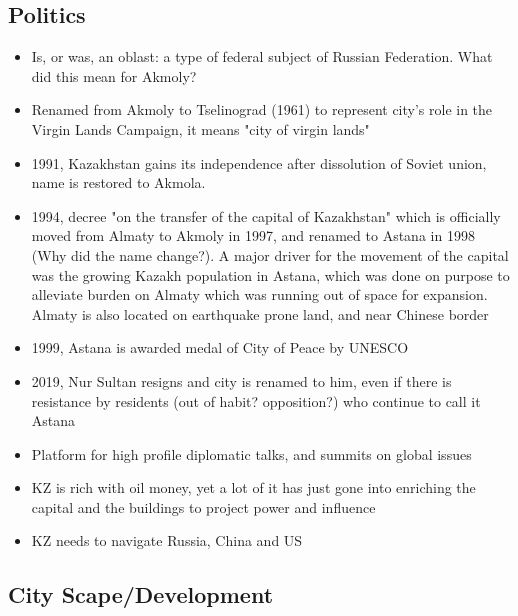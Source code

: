 \documentclass[12pt]{article}
\begin{document}
\subsection{Politics}

\begin{itemize}
  \item Is, or was, an oblast: a type of federal subject of Russian Federation. What did this mean for Akmoly? 
  \item Renamed from Akmoly to Tselinograd (1961) to represent city's role in the Virgin Lands Campaign, it means "city of virgin lands"
  \item 1991, Kazakhstan gains its independence after dissolution of Soviet union, name is restored to Akmola.
  \item 1994, decree "on the transfer of the capital of Kazakhstan" which is officially moved from Almaty to Akmoly in 1997, and renamed to Astana in 1998 (Why did the name change?). A major driver for the movement of the capital was the growing Kazakh population in Astana, which was done on purpose to alleviate burden on Almaty which was running out of space for expansion. Almaty is also located on earthquake prone land, and near Chinese border
  \item 1999, Astana is awarded medal of City of Peace by UNESCO
  \item 2019, Nur Sultan resigns and city is renamed to him, even if there is resistance by residents (out of habit? opposition?) who continue to call it Astana
  \item Platform for high profile diplomatic talks, and summits on global issues
  \item KZ is rich with oil money, yet a lot of it has just gone into enriching the capital and the buildings to project power and influence
  \item KZ needs to navigate Russia, China and US 
\end{itemize}


\subsection{City Scape/Development}
\end{document}
